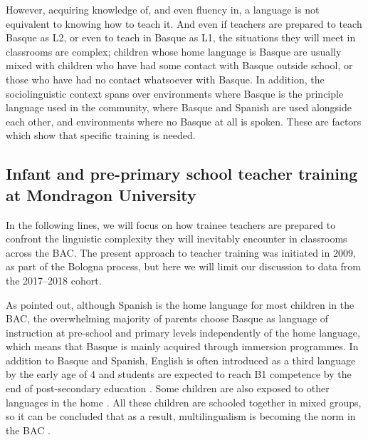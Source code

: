 \documentclass[output=paper]{../langscibook}
\begin{document}
However, acquiring knowledge of, and even fluency in, a language is not equivalent to knowing how to teach it. And even if teachers are prepared to teach Basque as L2, or even to teach in Basque as L1, the situations they will meet in classrooms are complex; children whose home language is Basque are usually mixed with children who have had some contact with Basque outside school, or those who have had no contact whatsoever with Basque. In addition, the sociolinguistic context spans over environments where Basque is the principle language used in the community, where Basque and Spanish are used alongside each other, and environments where no Basque at all is spoken. These are factors which show that specific training is needed.


\subsection{Infant and pre-primary school teacher training at Mondragon University}


In the following lines, we will focus on how trainee teachers are prepared to confront the linguistic complexity they will inevitably encounter in classrooms across the BAC. The present approach to teacher training was initiated in 2009, as part of the Bologna process, but here we will limit our discussion to data from the 2017--2018 cohort.  

As pointed out, although Spanish is the home language for most children in the BAC, the overwhelming majority of parents choose Basque as language of instruction at pre-school and primary levels independently of the home language, which means that Basque is mainly acquired through immersion programmes. In addition to Basque and Spanish, English is often introduced as a third language by the early age of 4 and students are expected to reach B1 competence by the end of post-secondary education \citep{Lasagabaster2000}. Some children are also exposed to other languages in the home \citep{Barnes2006}. All these children are schooled together in mixed groups, so it can be concluded that as a result, multilingualism is becoming the norm in the BAC \citep{Cenoz2009}.
\end{document}
